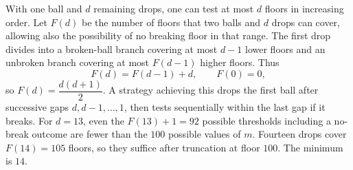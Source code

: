 With one ball and $d$ remaining drops, one can test at most $d$ floors in increasing order. Let $F(d)$ be the number of floors that two balls and $d$ drops can cover, allowing also the possibility of no breaking floor in that range. The first drop divides into a broken-ball branch covering at most $d-1$ lower floors and an unbroken branch covering at most $F(d-1)$ higher floors. Thus
\[
F(d)=F(d-1)+d,\qquad F(0)=0,
\]
so $F(d)=\dfrac{d(d+1)}{2}$. A strategy achieving this drops the first ball after successive gaps $d,d-1,\ldots,1$, then tests sequentially within the last gap if it breaks.
For $d=13$, even the $F(13)+1=92$ possible thresholds including a no-break outcome are fewer than the $100$ possible values of $m$. Fourteen drops cover $F(14)=105$ floors, so they suffice after truncation at floor $100$. The minimum is $\boxed{14}$.
